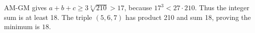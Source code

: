 AM-GM gives $ a+b+c\ge3\sqrt[3]{210}>17 $, because $ 17^3<27\cdot210 $. Thus the integer sum is at least 18. The triple $(5,6,7)$ has product 210 and sum 18, proving the minimum is $\boxed{18}$.
